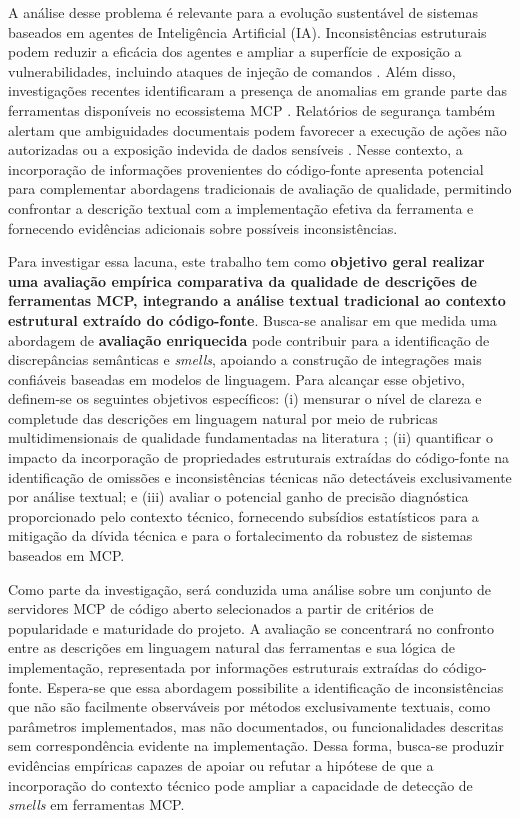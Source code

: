 A análise desse problema é relevante para a evolução sustentável de sistemas baseados em agentes de Inteligência Artificial (IA). Inconsistências estruturais podem reduzir a eficácia dos agentes e ampliar a superfície de exposição a vulnerabilidades, incluindo ataques de injeção de comandos \cite{Taraghi2026}. Além disso, investigações recentes identificaram a presença de anomalias em grande parte das ferramentas disponíveis no ecossistema MCP \cite{mcpAtFirstGlance}. Relatórios de segurança também alertam que ambiguidades documentais podem favorecer a execução de ações não autorizadas ou a exposição indevida de dados sensíveis \cite{NSA2026}. Nesse contexto, a incorporação de informações provenientes do código-fonte apresenta potencial para complementar abordagens tradicionais de avaliação de qualidade, permitindo confrontar a descrição textual com a implementação efetiva da ferramenta e fornecendo evidências adicionais sobre possíveis inconsistências.

Para investigar essa lacuna, este trabalho tem como \textbf{objetivo geral realizar uma avaliação empírica comparativa da qualidade de descrições de ferramentas MCP, integrando a análise textual tradicional ao contexto estrutural extraído do código-fonte}. Busca-se analisar em que medida uma abordagem de \textbf{avaliação enriquecida} pode contribuir para a identificação de discrepâncias semânticas e \textit{smells}, apoiando a construção de integrações mais confiáveis baseadas em modelos de linguagem. Para alcançar esse objetivo, definem-se os seguintes objetivos específicos: (i) mensurar o nível de clareza e completude das descrições em linguagem natural por meio de rubricas multidimensionais de qualidade fundamentadas na literatura \cite{2026arXiv260214878M}; (ii) quantificar o impacto da incorporação de propriedades estruturais extraídas do código-fonte na identificação de omissões e inconsistências técnicas não detectáveis exclusivamente por análise textual; e (iii) avaliar o potencial ganho de precisão diagnóstica proporcionado pelo contexto técnico, fornecendo subsídios estatísticos para a mitigação da dívida técnica e para o fortalecimento da robustez de sistemas baseados em MCP.

Como parte da investigação, será conduzida uma análise sobre um conjunto de servidores MCP de código aberto selecionados a partir de critérios de popularidade e maturidade do projeto. A avaliação se concentrará no confronto entre as descrições em linguagem natural das ferramentas e sua lógica de implementação, representada por informações estruturais extraídas do código-fonte. Espera-se que essa abordagem possibilite a identificação de inconsistências que não são facilmente observáveis por métodos exclusivamente textuais, como parâmetros implementados, mas não documentados, ou funcionalidades descritas sem correspondência evidente na implementação. Dessa forma, busca-se produzir evidências empíricas capazes de apoiar ou refutar a hipótese de que a incorporação do contexto técnico pode ampliar a capacidade de detecção de \textit{smells} em ferramentas MCP.

